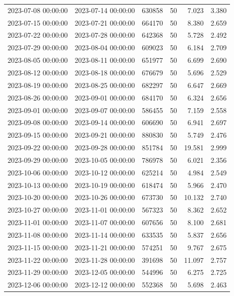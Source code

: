 \begin{tabular}{llrrrr}
2023-07-08 00:00:00 & 2023-07-14 00:00:00 & 630858 & 50 & 7.023 & 3.380 \\
2023-07-15 00:00:00 & 2023-07-21 00:00:00 & 664170 & 50 & 8.380 & 2.659 \\
2023-07-22 00:00:00 & 2023-07-28 00:00:00 & 642368 & 50 & 5.728 & 2.492 \\
2023-07-29 00:00:00 & 2023-08-04 00:00:00 & 609023 & 50 & 6.184 & 2.709 \\
2023-08-05 00:00:00 & 2023-08-11 00:00:00 & 651977 & 50 & 6.699 & 2.690 \\
2023-08-12 00:00:00 & 2023-08-18 00:00:00 & 676679 & 50 & 5.696 & 2.529 \\
2023-08-19 00:00:00 & 2023-08-25 00:00:00 & 682297 & 50 & 6.647 & 2.669 \\
2023-08-26 00:00:00 & 2023-09-01 00:00:00 & 684170 & 50 & 6.324 & 2.656 \\
2023-09-01 00:00:00 & 2023-09-07 00:00:00 & 586455 & 50 & 7.159 & 2.558 \\
2023-09-08 00:00:00 & 2023-09-14 00:00:00 & 606690 & 50 & 6.941 & 2.697 \\
2023-09-15 00:00:00 & 2023-09-21 00:00:00 & 880830 & 50 & 5.749 & 2.476 \\
2023-09-22 00:00:00 & 2023-09-28 00:00:00 & 851784 & 50 & 19.581 & 2.999 \\
2023-09-29 00:00:00 & 2023-10-05 00:00:00 & 786978 & 50 & 6.021 & 2.356 \\
2023-10-06 00:00:00 & 2023-10-12 00:00:00 & 625214 & 50 & 4.984 & 2.549 \\
2023-10-13 00:00:00 & 2023-10-19 00:00:00 & 618474 & 50 & 5.966 & 2.470 \\
2023-10-20 00:00:00 & 2023-10-26 00:00:00 & 673730 & 50 & 10.132 & 2.740 \\
2023-10-27 00:00:00 & 2023-11-01 00:00:00 & 567323 & 50 & 8.362 & 2.652 \\
2023-11-01 00:00:00 & 2023-11-07 00:00:00 & 607656 & 50 & 8.100 & 2.681 \\
2023-11-08 00:00:00 & 2023-11-14 00:00:00 & 633535 & 50 & 5.837 & 2.656 \\
2023-11-15 00:00:00 & 2023-11-21 00:00:00 & 574251 & 50 & 9.767 & 2.675 \\
2023-11-22 00:00:00 & 2023-11-28 00:00:00 & 391698 & 50 & 11.097 & 2.757 \\
2023-11-29 00:00:00 & 2023-12-05 00:00:00 & 544996 & 50 & 6.275 & 2.725 \\
2023-12-06 00:00:00 & 2023-12-12 00:00:00 & 552368 & 50 & 5.698 & 2.463 \\

\end{tabular}
